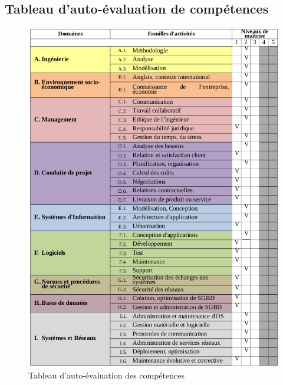 \documentclass[12pt,a4paper]{report}
\begin{document}
\begin{appendix}
\chapter{Tableau d'auto-évaluation de compétences}
\begin{figure}[!ht]
    \center
    \includegraphics[scale=0.9]{./img/tableau_cpt.png}
    \caption{Tableau d'auto-évaluation des compétences}
\end{figure}

\end{appendix}

\newpage
\printnoidxglossary[type=main]
\end{document}
